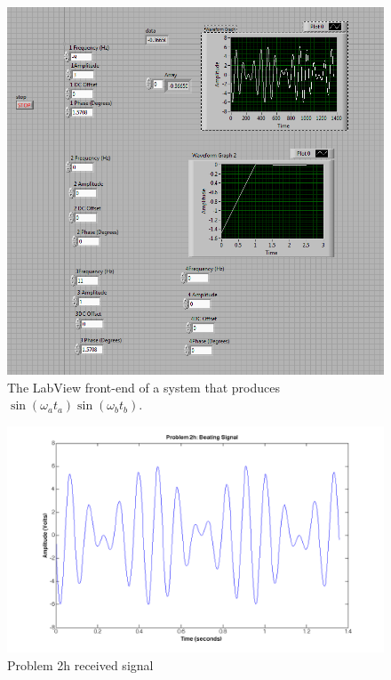 \documentclass{article}
\theoremstyle{plain}
\theoremstyle{definition}
\theoremstyle{remark}
\begin{document}
\begin{figure}[h]
\begin{center}
\includegraphics[width=15cm]{problem2_h.png}
\end{center}
\caption{The LabView front-end of a system that produces $\sin(\omega_a t_a)\sin(\omega_b t_b) $.}
\label{q2_h1}
\end{figure}

\begin{figure}[h]
\begin{center}
\includegraphics[width = 15cm]{problem2h_plot.png}
\end{center}
\caption{Problem 2h received signal}
\label{q2_h2}
\end{figure}
\end{document}

